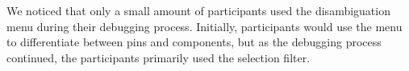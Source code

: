 \documentclass [11pt, proquest] {uwthesis}[2020/02/24]
\newcounter{sharc}
\newcommand{\sharcHere}[1]{Q\refstepcounter{sharc}\arabic{sharc}\label{#1}}
\begin{document}

We noticed that only a small amount of participants used the disambiguation menu during their debugging process. Initially, participants would use the menu to differentiate between pins and components, but as the debugging process continued, the participants primarily used the selection filter.




\end{document}
